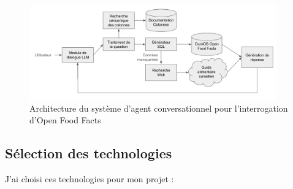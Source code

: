 \documentclass[a4paper,11pt]{article}
\begin{document}
\begin{figure}[H]
    \centering
    \includegraphics[width=0.95\textwidth]{figures/architecture-agent.png}
    \caption{Architecture du système d'agent conversationnel pour l'interrogation d'Open Food Facts}
    \label{fig:architecture}
\end{figure}


\subsection{Sélection des technologies}

J'ai choisi ces technologies pour mon projet :
\end{document}
